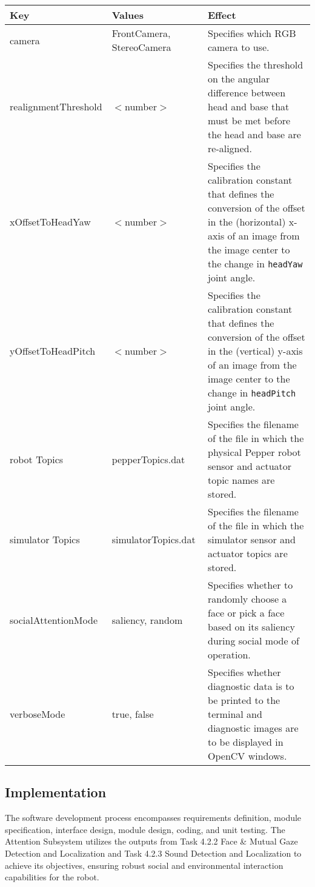 \documentclass{CSSRforAfrica}
\begin{document}
\begin{center}
	\begin{tabular}{ |p{4cm}|p{4cm}|p{6cm}| }
		\hline
		\textbf{Key} & \textbf{Values} & \textbf{Effect} \\ \hline
		camera & FrontCamera, StereoCamera & Specifies which RGB camera to use.  \\
		\hline
		realignmentThreshold & $<$number$>$ & Specifies the threshold on the angular difference between head and base that must be met before the head and base are re-aligned.  \\
		\hline
		xOffsetToHeadYaw & $<$number$>$ & Specifies the calibration constant that defines the conversion of the offset in the (horizontal) x-axis of an image from the image center to the change in \texttt{headYaw} joint angle. \\
		\hline
		yOffsetToHeadPitch & $<$number$>$ & Specifies the calibration constant that defines the conversion of the offset in the (vertical) y-axis of an image from the image center to the change in \texttt{headPitch} joint angle. \\
		\hline
		robot Topics & pepperTopics.dat & Specifies the filename of the file in which the physical Pepper robot sensor and actuator topic names are stored. \\
		\hline
		simulator Topics & simulatorTopics.dat & Specifies the filename of the file in which the simulator sensor and actuator topics are stored. \\
		\hline
		socialAttentionMode & saliency, random & Specifies whether to randomly choose a face or pick a face based on its saliency during social mode of operation.\\
		\hline
		verboseMode & true, false & Specifies whether diagnostic data is to be printed to the terminal and diagnostic images are to be displayed in OpenCV windows.\\
		\hline
	\end{tabular}
\end{center}

 
\subsection{Implementation}
 
The software development process encompasses requirements definition, module specification, interface design, module design, coding, and unit testing. The Attention Subsystem utilizes the outputs from Task 4.2.2 Face \& Mutual Gaze Detection and Localization and Task 4.2.3 Sound Detection and Localization to achieve its objectives, ensuring robust social and environmental interaction capabilities for the robot.
\newpage
\end{document}
